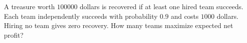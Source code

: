 A treasure worth $100000$ dollars is recovered if at least one hired team succeeds. Each team independently succeeds with probability $0.9$ and costs $1000$ dollars. Hiring no team gives zero recovery. How many teams maximize expected net profit?
